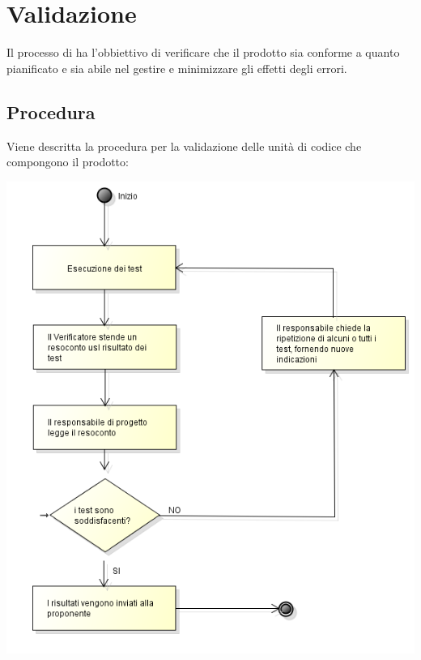 \section{Validazione}
\label{Validazione}
Il processo di  ha l'obbiettivo di verificare che il prodotto sia conforme a quanto pianificato e sia abile nel gestire e minimizzare gli effetti degli errori.

\subsection{Procedura}
Viene descritta la procedura per la validazione delle unità di codice che compongono il prodotto:

\begin{center}
		\includegraphics[scale=0.60]{images/uml.png}
\end{center}

